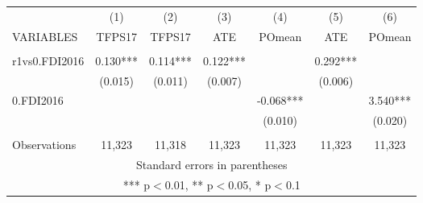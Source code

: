 \documentclass[]{article}
\begin{document}
\begin{tabular}{lcccccc} \hline
 & (1) & (2) & (3) & (4) & (5) & (6) \\
VARIABLES & TFPS17 & TFPS17 & ATE & POmean & ATE & POmean \\ \hline
 &  &  &  &  &  &  \\
r1vs0.FDI2016 & 0.130*** & 0.114*** & 0.122*** &  & 0.292*** &  \\
 & (0.015) & (0.011) & (0.007) &  & (0.006) &  \\
0.FDI2016 &  &  &  & -0.068*** &  & 3.540*** \\
 &  &  &  & (0.010) &  & (0.020) \\
 &  &  &  &  &  &  \\
 Observations & 11,323 & 11,318 & 11,323 & 11,323 & 11,323 & 11,323 \\ \hline
\multicolumn{7}{c}{ Standard errors in parentheses} \\
\multicolumn{7}{c}{ *** p$<$0.01, ** p$<$0.05, * p$<$0.1} \\
\end{tabular}
\end{document}
